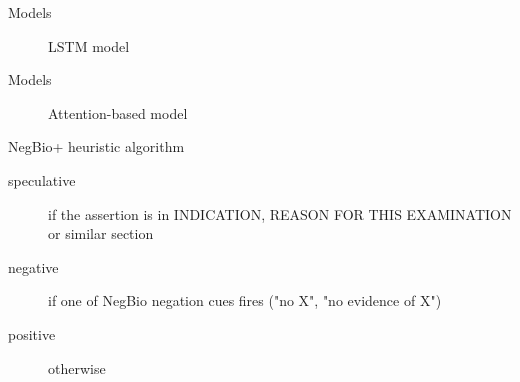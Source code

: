 \documentclass[pdf]{beamer}
\newcommand{\?}{\ensuremath{^\texttt{\bf [CITATION~NEEDED]}}}
\begin{document}
\begin{frame}{Models}

\begin{figure}
\centering
{}
\caption{LSTM model}
\label{fig_lstm}
\end{figure}

\end{frame}

\begin{frame}{Models}

\begin{figure}
\centering
{}
\caption{Attention-based model}
\label{fig_attention}
\end{figure}

\end{frame}

\begin{frame}{NegBio+ heuristic algorithm}

\begin{description}
\item[speculative] if the assertion is in INDICATION, REASON FOR THIS EXAMINATION or similar section
\item[negative] if one of NegBio negation cues fires ("no X", "no evidence of X")
\item[positive] otherwise
\end{description}

\end{frame}
\end{document}
